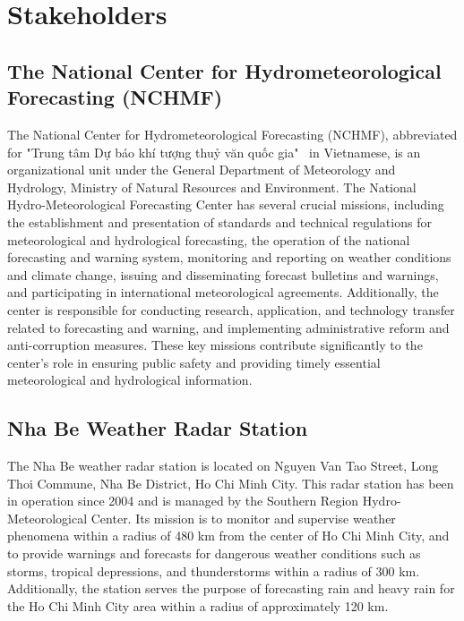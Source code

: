 \section{Stakeholders}

\subsection{The National Center for Hydrometeorological Forecasting (NCHMF)}

The National Center for Hydrometeorological Forecasting (NCHMF), abbreviated for
"Trung tâm Dự báo khí tượng thuỷ văn quốc gia" \ in Vietnamese, is an
organizational unit under the General Department of Meteorology and Hydrology,
Ministry of Natural Resources and Environment\cite{NMHS}. The National
Hydro-Meteorological Forecasting Center has several crucial missions, including
the establishment and presentation of standards and technical regulations for
meteorological and hydrological forecasting, the operation of the national
forecasting and warning system, monitoring and reporting on weather conditions
and climate change, issuing and disseminating forecast bulletins and warnings,
and participating in international meteorological agreements. Additionally, the
center is responsible for conducting research, application, and technology
transfer related to forecasting and warning, and implementing administrative
reform and anti-corruption measures. These key missions contribute significantly
to the center's role in ensuring public safety and providing timely essential
meteorological and hydrological information.

\subsection{Nha Be Weather Radar Station}

The Nha Be weather radar station is located on Nguyen Van Tao Street, Long Thoi
Commune, Nha Be District, Ho Chi Minh City. This radar station has been in
operation since 2004 and is managed by the Southern Region Hydro-Meteorological
Center. Its mission is to monitor and supervise weather phenomena within a
radius of 480 km from the center of Ho Chi Minh City, and to provide warnings
and forecasts for dangerous weather conditions such as storms, tropical
depressions, and thunderstorms within a radius of 300 km. Additionally, the
station serves the purpose of forecasting rain and heavy rain for the Ho Chi
Minh City area within a radius of approximately 120 km.

